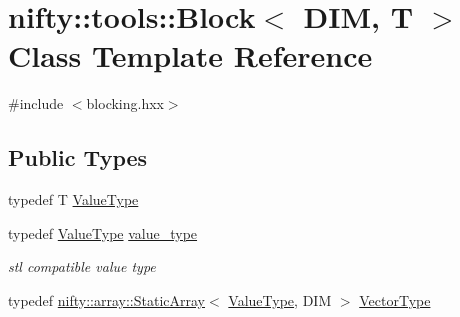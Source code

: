 \hypertarget{classnifty_1_1tools_1_1Block}{}\section{nifty\+:\+:tools\+:\+:Block$<$ D\+IM, T $>$ Class Template Reference}
\label{classnifty_1_1tools_1_1Block}


{\ttfamily \#include $<$blocking.\+hxx$>$}

\subsection*{Public Types}
\begin{DoxyCompactItemize}
\item 
typedef T \hyperlink{classnifty_1_1tools_1_1Block_a3e77342701a32fcc670d398f1b9bc6d4}{Value\+Type}
\item 
typedef \hyperlink{classnifty_1_1tools_1_1Block_a3e77342701a32fcc670d398f1b9bc6d4}{Value\+Type} \hyperlink{classnifty_1_1tools_1_1Block_accbed9defe9a82425025d9182c41e0a6}{value\+\_\+type}
\begin{DoxyCompactList}\small\item\em stl compatible value type \end{DoxyCompactList}\item 
typedef \hyperlink{namespacenifty_1_1array_a683f151f19c851754e0c6d55ed16a0c2}{nifty\+::array\+::\+Static\+Array}$<$ \hyperlink{classnifty_1_1tools_1_1Block_a3e77342701a32fcc670d398f1b9bc6d4}{Value\+Type}, D\+IM $>$ \hyperlink{classnifty_1_1tools_1_1Block_aa077b4ebbf3e4e9b679d1957ca10ba32}{Vector\+Type}
\end{DoxyCompactItemize}
